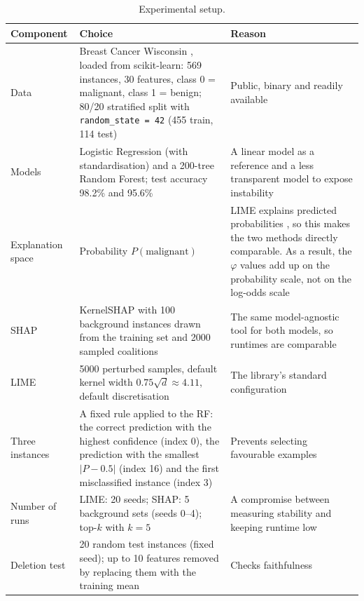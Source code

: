 \documentclass[11pt,a4paper]{article}
\newcommand{\code}[1]{\texttt{#1}}
\begin{document}
\begin{table}[!htb]
\centering\small
\caption{Experimental setup.}\label{tab:setup}
\begin{tabularx}{\textwidth}{L{2.4cm}XL{3.8cm}}
\toprule
\textbf{Component} & \textbf{Choice} & \textbf{Reason}\\
\midrule
Data & Breast Cancer Wisconsin \cite{street}, loaded from scikit-learn: 569 instances, 30 features, class 0 = malignant, class 1 = benign; 80/20 stratified split with \code{random\_state = 42} (455 train, 114 test) & Public, binary and readily available\\
Models & Logistic Regression (with standardisation) and a 200-tree Random Forest; test accuracy 98.2\% and 95.6\% & A linear model as a reference and a less transparent model to expose instability\\
Explanation space & Probability $P(\text{malignant})$ & LIME explains predicted probabilities \cite{ribeiro}, so this makes the two methods directly comparable. As a result, the $\varphi$ values add up on the probability scale, not on the log-odds scale\\
SHAP & KernelSHAP \cite{lundberg} with 100 background instances drawn from the training set and 2000 sampled coalitions & The same model-agnostic tool for both models, so runtimes are comparable\\
LIME & 5000 perturbed samples, default kernel width $0.75\sqrt{d} \approx 4.11$, default discretisation & The library's standard configuration\\
Three instances & A fixed rule applied to the RF: the correct prediction with the highest confidence (index 0), the prediction with the smallest $|P - 0.5|$ (index 16) and the first misclassified instance (index 3) & Prevents selecting favourable examples\\
Number of runs & LIME: 20 seeds; SHAP: 5 background sets (seeds 0--4); top-$k$ with $k = 5$ & A compromise between measuring stability and keeping runtime low\\
Deletion test & 20 random test instances (fixed seed); up to 10 features removed by replacing them with the training mean & Checks faithfulness\\
\bottomrule
\end{tabularx}
\end{table}
\end{document}
